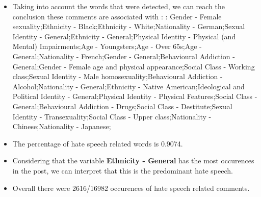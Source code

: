 \documentclass[11pt]{article}
\begin{document}
\begin{itemize}\item Taking into account the words that were detected, we can reach the conclusion these comments are associated with : : Gender - Female sexuality;Ethnicity - Black;Ethnicity - White;Nationality - German;Sexual Identity - General;Ethnicity - General;Physical Identity - Physical (and Mental) Impairments;Age - Youngsters;Age - Over 65s;Age - General;Nationality - French;Gender - General;Behavioural Addiction - General;Gender - Female age and physical appearance;Social Class - Working class;Sexual Identity - Male homosexuality;Behavioural Addiction - Alcohol;Nationality - General;Ethnicity - Native American;Ideological and Political Identity - General;Physical Identity - Physical Features;Social Class - General;Behavioural Addiction - Drugs;Social Class - Destitute;Sexual Identity - Transexuality;Social Class - Upper class;Nationality - Chinese;Nationality - Japanese;%

\item The percentage of hate speech related words is 0.9074.

\item Considering that the variable \textbf{Ethnicity - General} has the most occurences in the post, we can interpret that this is the predominant hate speech.

\item Overall there were 2616/16982 occurences of hate speech related comments.\end{itemize}
\end{document}

